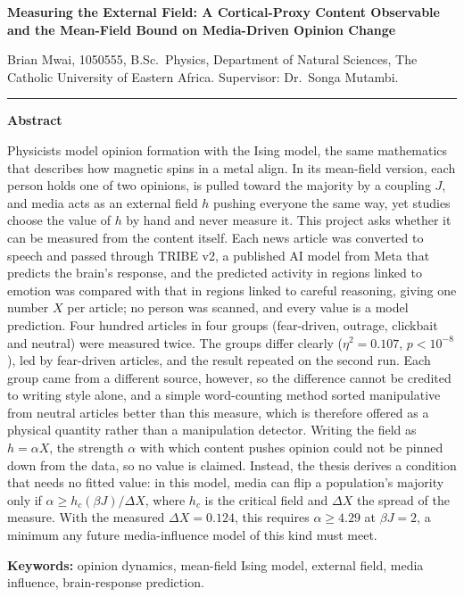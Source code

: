 \documentclass[11pt,a4paper]{article}
\begin{document}
{\large\bfseries Measuring the External Field: A Cortical-Proxy Content Observable and the
Mean-Field Bound on Media-Driven Opinion Change}

\vspace{4pt}
Brian Mwai, 1050555, B.Sc.\ Physics, Department of Natural Sciences, The Catholic University
of Eastern Africa. Supervisor: Dr.\ Songa Mutambi.

\vspace{2pt}\hrule\vspace{8pt}

\textbf{Abstract}

Physicists model opinion formation with the Ising model, the same mathematics that describes
how magnetic spins in a metal align. In its mean-field version, each person holds one of two
opinions, is pulled toward the majority by a coupling $J$, and media acts as an external field
$h$ pushing everyone the same way, yet studies choose the value of $h$ by hand and never
measure it. This project asks whether it can be measured from the content itself. Each news
article was converted to speech and passed through TRIBE v2, a published AI model from Meta
that predicts the brain's response, and the predicted activity in regions linked to emotion
was compared with that in regions linked to careful reasoning, giving one number $X$ per
article; no person was scanned, and every value is a model prediction. Four hundred articles
in four groups (fear-driven, outrage, clickbait and neutral) were measured twice. The groups
differ clearly ($\eta^2 = 0.107$, $p < 10^{-8}$), led by fear-driven articles, and the result
repeated on the second run. Each group came from a different source, however, so the
difference cannot be credited to writing style alone, and a simple word-counting method sorted
manipulative from neutral articles better than this measure, which is therefore offered as a
physical quantity rather than a manipulation detector. Writing the field as $h = \alpha X$, the
strength $\alpha$ with which content pushes opinion could not be pinned down from the data, so
no value is claimed. Instead, the thesis derives a condition that needs no fitted value: in
this model, media can flip a population's majority only if $\alpha \ge h_c(\beta J)/\Delta X$,
where $h_c$ is the critical field and $\Delta X$ the spread of the measure. With the measured
$\Delta X = 0.124$, this requires $\alpha \ge 4.29$ at $\beta J = 2$, a minimum any future
media-influence model of this kind must meet.

\textbf{Keywords:} opinion dynamics, mean-field Ising model, external field, media influence,
brain-response prediction.
\end{document}
